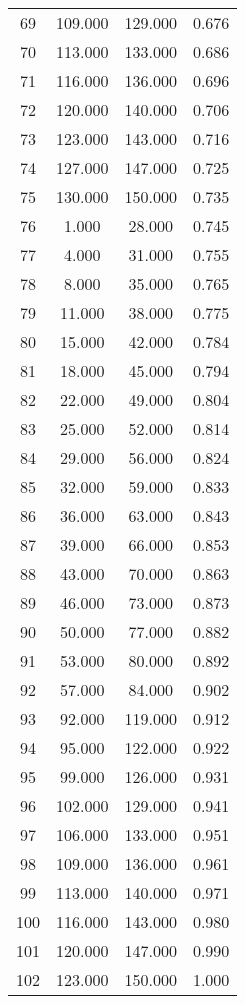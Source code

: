\begin{tabular}{cccc}
  69 & 109.000 & 129.000 & 0.676 \\ 
  70 & 113.000 & 133.000 & 0.686 \\ 
  71 & 116.000 & 136.000 & 0.696 \\ 
  72 & 120.000 & 140.000 & 0.706 \\ 
  73 & 123.000 & 143.000 & 0.716 \\ 
  74 & 127.000 & 147.000 & 0.725 \\ 
  75 & 130.000 & 150.000 & 0.735 \\ 
  76 & 1.000 & 28.000 & 0.745 \\ 
  77 & 4.000 & 31.000 & 0.755 \\ 
  78 & 8.000 & 35.000 & 0.765 \\ 
  79 & 11.000 & 38.000 & 0.775 \\ 
  80 & 15.000 & 42.000 & 0.784 \\ 
  81 & 18.000 & 45.000 & 0.794 \\ 
  82 & 22.000 & 49.000 & 0.804 \\ 
  83 & 25.000 & 52.000 & 0.814 \\ 
  84 & 29.000 & 56.000 & 0.824 \\ 
  85 & 32.000 & 59.000 & 0.833 \\ 
  86 & 36.000 & 63.000 & 0.843 \\ 
  87 & 39.000 & 66.000 & 0.853 \\ 
  88 & 43.000 & 70.000 & 0.863 \\ 
  89 & 46.000 & 73.000 & 0.873 \\ 
  90 & 50.000 & 77.000 & 0.882 \\ 
  91 & 53.000 & 80.000 & 0.892 \\ 
  92 & 57.000 & 84.000 & 0.902 \\ 
  93 & 92.000 & 119.000 & 0.912 \\ 
  94 & 95.000 & 122.000 & 0.922 \\ 
  95 & 99.000 & 126.000 & 0.931 \\ 
  96 & 102.000 & 129.000 & 0.941 \\ 
  97 & 106.000 & 133.000 & 0.951 \\ 
  98 & 109.000 & 136.000 & 0.961 \\ 
  99 & 113.000 & 140.000 & 0.971 \\ 
  100 & 116.000 & 143.000 & 0.980 \\ 
  101 & 120.000 & 147.000 & 0.990 \\ 
  102 & 123.000 & 150.000 & 1.000 \\ 
   \hline
\end{tabular}
